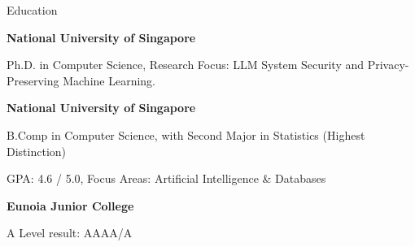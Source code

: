 \begin{rubric}{Education}

%
    \textbf{National University of Singapore}\par
    Ph.D. in Computer Science, Research Focus: LLM System Security and Privacy-Preserving Machine Learning.

%
    \textbf{National University of Singapore}\par
    B.Comp in Computer Science, with Second Major in Statistics (Highest Distinction)\par
    GPA: 4.6 / 5.0, Focus Areas: Artificial Intelligence \& Databases

%
    \textbf{Eunoia Junior College}\par
    A Level result: AAAA/A

\end{rubric}
